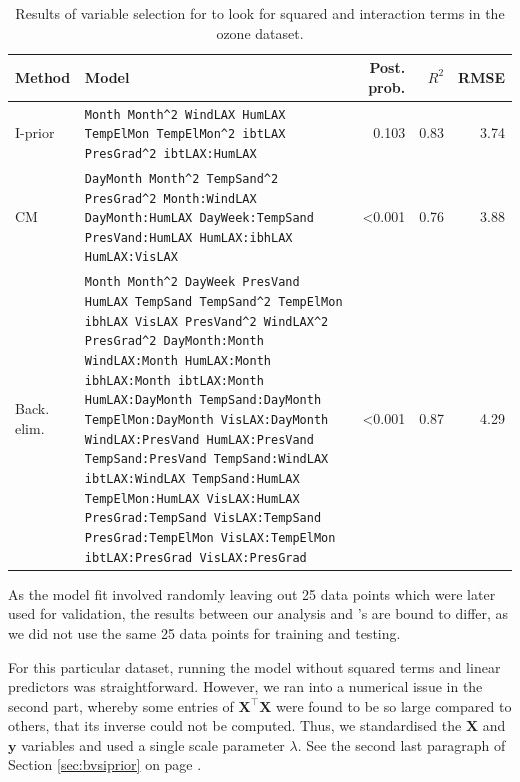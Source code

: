 \begin{table}[h]
\centering\small
\begin{tabular}{p{1.1cm}|m{7.5cm}rrr}
Method      & Model                           & Post. prob.     & $R^2$		& RMSE  \\
\hline
I-prior        & \texttt{Month Month\textasciicircum2 WindLAX HumLAX  TempElMon TempElMon\textasciicircum2 ibtLAX PresGrad\textasciicircum2 ibtLAX:HumLAX}	& 0.103	& 0.83	&3.74 \\
\hline
CM     &  \texttt{DayMonth Month\textasciicircum2 TempSand\textasciicircum2 PresGrad\textasciicircum2 Month:WindLAX DayMonth:HumLAX DayWeek:TempSand PresVand:HumLAX HumLAX:ibhLAX HumLAX:VisLAX}                                                                                                                                                                                                                                                                                                                                                                 & \textless 0.001 & 0.76  & 3.88    \\
\hline
Back. elim. & \texttt{Month Month\textasciicircum2 DayWeek PresVand HumLAX TempSand TempSand\textasciicircum2 TempElMon ibhLAX VisLAX  PresVand\textasciicircum2 WindLAX\textasciicircum2  PresGrad\textasciicircum2 DayMonth:Month WindLAX:Month HumLAX:Month ibhLAX:Month ibtLAX:Month HumLAX:DayMonth TempSand:DayMonth TempElMon:DayMonth VisLAX:DayMonth WindLAX:PresVand HumLAX:PresVand TempSand:PresVand TempSand:WindLAX ibtLAX:WindLAX TempSand:HumLAX TempElMon:HumLAX VisLAX:HumLAX PresGrad:TempSand VisLAX:TempSand PresGrad:TempElMon VisLAX:TempElMon ibtLAX:PresGrad VisLAX:PresGrad} & \textless 0.001 & 0.87 &4.29   
\end{tabular}
\caption{Results of variable selection for to look for squared and interaction terms in the ozone dataset.}
\label{tab:resozone2}
\end{table}

\begin{remark}
	As the model fit involved randomly leaving out 25 data points which were later used for  validation, the results between our analysis and \citeauthor{Casella2006}'s are bound to differ, as we did not use the same 25 data points for training and testing.
\end{remark}



\begin{remark}
	For this particular dataset, running the model without squared terms and linear predictors was straightforward. However, we ran into a numerical issue in the second part, whereby some entries of $\mathbf X^\top \mathbf X$ were found to be so large compared to others, that its inverse could not be computed. Thus, we standardised the $\mathbf X$ and $\mathbf y$ variables and used a single scale parameter $\lambda$. See the second last paragraph of Section \ref{sec:bvsiprior} on page \pageref{sec:bvsiprior}.
\end{remark}

